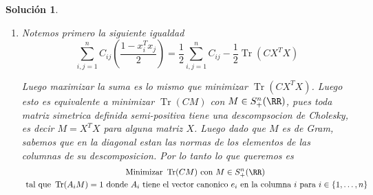 \documentclass[a4paper,oneside,10.5pt]{USMArt}
\DeclareMathOperator{\tr}{Tr}
\newtheorem{sol}{Soluci\'on}
\begin{document}
\begin{sol}
\begin{enumerate}
          Veamos que $P = X^TX$. Notemos que
          \begin{equation*}
            (X^{T}X)_{ij} = \sum_{k = 1}^n x_{k,i} x_{k,j} = x_{i}^T x_j
          \end{equation*}

          Por lo tanto se tiene la igualdad $P = X^TX$. Si $b \in \RR^n$, tenemos que
          \begin{equation*}
            b^TPb = b^TX^TXb =(Xb)^TXb = ||Xb||^2 \geq 0
          \end{equation*}

    \item
          Notemos primero la siguiente igualdad
          \begin{equation*}
            \sum_{i,j = 1}^n C_{ij}(\frac{1 - x_i^T x_j}{2}) = \frac{1}{2} \sum_{i, j = 1}^n C_{ij} - \frac{1}{2} \tr(CX^TX)
          \end{equation*}

          Luego maximizar la suma es lo mismo que minimizar $\tr(CX^TX)$. Luego esto es
          equivalente a minimizar $\tr(CM)$ con $M \in S_+^n(\RR)$, pues toda matriz
          simetrica definida semi-positiva tiene una descompsocion de Cholesky, es decir
          $M = X^TX$ para alguna matriz $X$. Luego dado que $M$ es de Gram, sabemos que
          en la diagonal estan las normas de los elementos de las columnas de su descomposicion. Por lo tanto lo que queremos es
          \begin{gather*}
            \text{Minimizar } \tr(CM) \text{ con } M \in S^n_+(\RR)\\ \text{ tal que } \tr(A_iM) = 1 \text{ donde } A_i \text{ tiene el vector canonico } e_i \text{ en la columna }i \text{ para } i \in \{1, \dots, n\}
          \end{gather*}
  \end{enumerate}
\end{sol}
\end{document}

